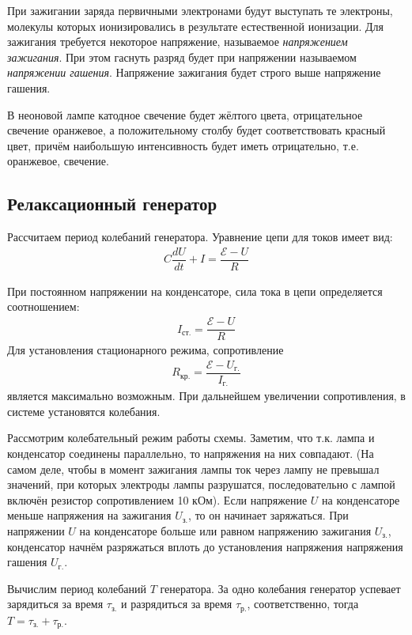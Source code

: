 \documentclass[a4paper, usenames, dvipsnames]{article}
\begin{document}
При зажигании заряда первичными электронами будут выступать те электроны,
молекулы которых ионизировались в результате естественной ионизации.
Для зажигания требуется некоторое напряжение, называемое {\it напряжением зажигания}.
При этом гаснуть разряд будет при напряжении называемом {\it напряжении гашения}.
Напряжение зажигания будет строго выше напряжение гашения.

В неоновой лампе катодное свечение будет жёлтого цвета,
отрицательное свечение оранжевое,
а положительному столбу будет соответствовать красный цвет,
причём наибольшую интенсивность будет иметь отрицательно, т.е. оранжевое, свечение.

\subsection*{Релаксационный генератор}

Рассчитаем период колебаний генератора.
Уравнение цепи для токов имеет вид:
\begin{gather*}
    C \dfrac{dU}{dt} + I = \dfrac{\mathcal{E} - U}{R}
\end{gather*}

При постоянном напряжении на конденсаторе,
сила тока в цепи определяется соотношением:
\begin{gather*}
    I_\text{ст.} = \dfrac{\mathcal{E} - U}{R}
\end{gather*}
Для установления стационарного режима,
сопротивление
\begin{gather*}
    R_\text{кр.} = \dfrac{\mathcal{E} - U_\text{г.}}{I_\text{г.}}
\end{gather*}
является максимально возможным.
При дальнейшем увеличении сопротивления,
в системе установятся колебания.

Рассмотрим колебательный режим работы схемы.
Заметим, что т.к. лампа и конденсатор соединены параллельно,
то напряжения на них совпадают. (На самом деле,
чтобы в момент зажигания лампы ток через лампу не превышал значений,
при которых электроды лампы разрушатся,
последовательно с лампой включён резистор сопротивлением 10 кОм).
Если напряжение $U$ на конденсаторе меньше напряжения на зажигания $U_\text{з.}$,
то он начинает заряжаться. При напряжении $U$ на конденсаторе больше или равном
напряжению зажигания $U_\text{з.}$, конденсатор начнём разряжаться вплоть
до установления напряжения напряжения гашения $U_\text{г.}$.

Вычислим период колебаний $T$ генератора.
За одно колебания генератор успевает зарядиться за время $\tau_\text{з.}$
и разрядиться за время $\tau_\text{р.}$, соответственно,
тогда $T = \tau_\text{з.} + \tau_\text{р.}$.
\end{document}
